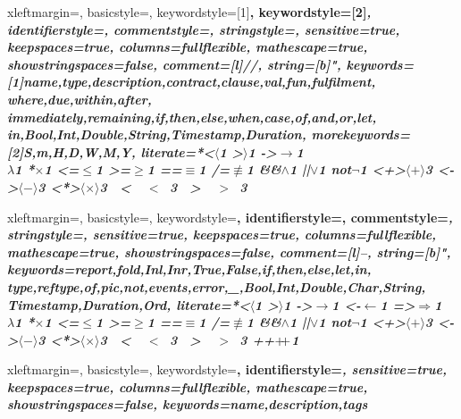 {
 xleftmargin=\parindent,
 basicstyle=\upshape\scriptsize,
 keywordstyle=[1]\bfseries,
 keywordstyle=[2]\itshape,
 identifierstyle=\poetsidstyle,
 commentstyle=\itshape\bfseries,
 stringstyle=\ttfamily,
 sensitive=true,
 keepspaces=true,
 columns=fullflexible,
 mathescape=true,
 showstringspaces=false,
 comment=[l]//,
 string=[b]{"},
 keywords=[1]{name,type,description,contract,clause,val,fun,fulfilment,%
                   where,due,within,after,%
                   immediately,remaining,if,then,else,when,case,of,and,or,let,%
                   in,Bool,Int,Double,String,Timestamp,Duration},
 morekeywords=[2]{S,m,H,D,W,M,Y},
 literate=*{<}{$\langle$}{1} {>}{$\rangle$}{1} {->}{$\rightarrow$}{1}
                {\\}{$\lambda$}{1}
                {*}{$\times$}{1}
                {<=}{$\le$}{1} {>=}{$\ge$}{1}
                {==}{$\equiv$}{1} {/=}{$\not\equiv$}{1}
                {&&}{$\land$}{1}
                {||}{$\lor$}{1}
                {not}{$\lnot$}{1}
                {<+>}{$\langle + \rangle$}{3}
                {<->}{$\langle - \rangle$}{3}
                {<*>}{$\langle \times \rangle$}{3}
                {\ <\ }{\ $<$\ }{3} {\ >\ }{\ $>$\ }{3}
}

{
 xleftmargin=\parindent,
 basicstyle=\upshape\scriptsize,
 keywordstyle=\bfseries,
 identifierstyle=\poetsidstyle,
 commentstyle=\itshape\bfseries,
 stringstyle=\ttfamily,
 sensitive=true,
 keepspaces=true,
 columns=fullflexible,
 mathescape=true,
 showstringspaces=false,
 comment=[l]--,
 string=[b]{"},
 keywords={report,fold,Inl,Inr,True,False,if,then,else,let,in,%
                   type,reftype,of,pic,not,events,error,_,Bool,Int,Double,Char,String,%
                   Timestamp,Duration,Ord},
 literate=*{<}{$\langle$}{1} {>}{$\rangle$}{1} {->}{$\rightarrow$}{1}
                {<-}{$\leftarrow$}{1}
                {=>}{$\Rightarrow$}{1}
                {\\}{$\lambda$}{1}
                {*}{$\times$}{1}
                {<=}{$\le$}{1} {>=}{$\ge$}{1}
                {==}{$\equiv$}{1} {/=}{$\not\equiv$}{1}
                {&&}{$\land$}{1}
                {||}{$\lor$}{1}
                {not}{$\lnot$}{1}
                {<+>}{$\langle + \rangle$}{3}
                {<->}{$\langle - \rangle$}{3}
                {<*>}{$\langle \times \rangle$}{3}
                {\ <\ }{\ $<$\ }{3} {\ >\ }{\ $>$\ }{3}
                {++}{$+\hspace{-3pt}+$}{1}
}

{
 xleftmargin=\parindent,
 basicstyle=\upshape\scriptsize,
 keywordstyle=\bfseries,
 identifierstyle=\itshape,
 sensitive=true,
 keepspaces=true,
 columns=fullflexible,
 mathescape=true,
 showstringspaces=false,
 keywords={name,description,tags}
}

